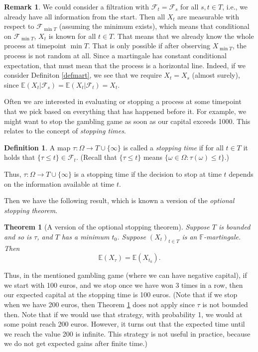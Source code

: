 \documentclass[11pt]{article}
\theoremstyle{plain}
\newtheorem{theorem}{Theorem}[section]
\theoremstyle{definition}
\newtheorem{definition}{Definition}[section]
\newtheorem{remark}{Remark}[section]%
\newcommand{\F}{\mathcal{F}}
\begin{document}
\begin{remark}
We could consider  a filtration with $\F_t =\F_s$ for all $s,t\in T$, i.e., we already have all information from the start. Then all $X_{t}$ are measurable with respect to $\F_{\min T}$ (assuming the minimum exists), which means that conditional on $\F_{\min T}$,  $X_{t}$ is known for all $t\in T$.
That means that we already know the whole process at timepoint $\min T$. That is only possible if after observing $X_{\min T}$, the process is not random at all. Since a martingale has constant conditional expectation, that must mean that the process is a horizontal line.
Indeed, if we consider Definiton \ref{defmart}, we see that we require $X_t =X_s$ (almost surely), since $\mathbb{E}(X_t|\mathcal{F}_s) = \mathbb{E}(X_t|\mathcal{F}_t) =X_t$. %
\end{remark}



Often we are interested in evaluating or stopping a process at some timepoint that we pick based on everything that has happened before it. For example, we might want to stop the gambling game as soon as our capital exceeds 1000. This relates to the concept of \emph{stopping times}.

\begin{definition}
A map $\tau: \Omega \rightarrow T\cup\{\infty\}$ is called a \emph{stopping time} if for all $t\in T$ it holds that $\{\tau \leq t\}\in \mathcal{F}_t$.  (Recall that $\{\tau\leq t\}$ means  $\{\omega \in\Omega:\tau(\omega)\leq t\}$.)
\end{definition}

Thus, $\tau: \Omega \rightarrow T\cup\{\infty\}$ is a stopping time if the decision to stop at time $t$ depends on the information available at time $t$.


Then we have the following result, which is known a version of the \emph{optional stopping theorem}.


\begin{theorem}[A version of the optional stopping theorem] \label{thmopstop}
Suppose $T$ is bounded and so is $\tau$, and $T$ has a minimum $t_0$. Suppose $(X_t)_{t\in T}$ is an  $\mathbb{F}$-martingale. Then
$$\mathbb{E}(X_{\tau})=\mathbb{E}(X_{t_0}).$$
\end{theorem}



Thus, in the mentioned gambling game (where we can have negative capital), if we start with 100 euros, and we stop once we have won 3 times in a row, then our expected capital at the stopping time is 100 euros. 
(Note that if we stop when we have 200 euros, then Theorem \ref{thmopstop} does not apply since $\tau$ is not bounded then. Note that if we would use that strategy, with probability 1, we would at some point reach 200 euros. However, it turns out that the expected time until we reach the value 200 is infinite. This strategy is not useful in practice, because  we do not get expected gains after finite time.)
\end{document}
